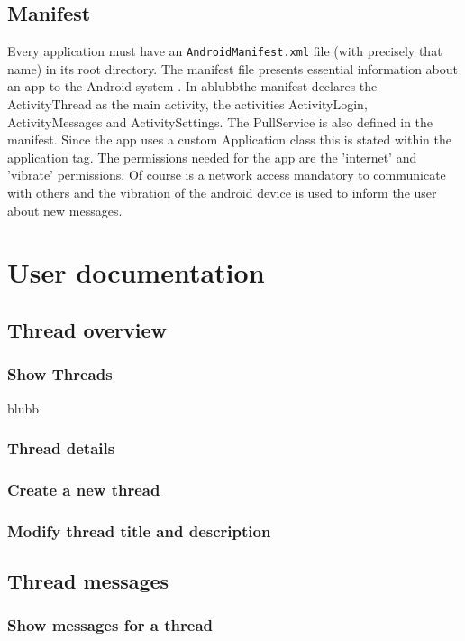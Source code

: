 \documentclass[12pt,a4paper,oneside]{report}
\newcommand{\appname}{ablubb}
\newcommand{\code}[1]{\lstinline{#1}}
\begin{document}
\section{Manifest}
Every application must have an \code{AndroidManifest.xml} file (with precisely that name) in its root directory. The manifest file presents essential information about an app to the Android system \citep{aDefManifest}.
In \appname  the manifest declares the ActivityThread as the main activity, the activities ActivityLogin, ActivityMessages and ActivitySettings. The PullService is also defined in the manifest. Since the app uses a custom Application class this is stated within the application tag.
The permissions needed for the app are the 'internet' and 'vibrate' permissions. Of course is a network access mandatory to communicate with others and the vibration of the android device is used to inform the user about new messages.

\chapter{User documentation}

\section{Thread overview}

\subsection{Show Threads}
blubb
\subsection{Thread details}

\subsection{Create a new thread}

\subsection{Modify thread title and description}

\section{Thread messages}

\subsection{Show messages for a thread}
\end{document}
